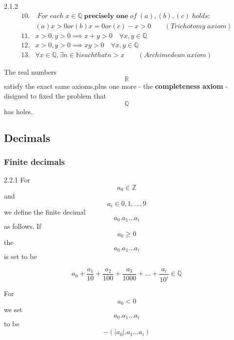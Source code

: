 \documentclass[a4paper]{article}
\begin{document}
\begin{axioms}{2.1.2}{}
    \begin{align*}
        10.&\;For \;each \; x\in \mathbb{Q}\; \textbf{precisely one} \;of \;(a),(b),(c) \;holds:\\  
        &(a)x>0 or (b)x=0 or (c)-x>0   \qquad(Trichotomy \;axiom)\\
        11.& x>0,y>0 \implies x+y>0  \quad\forall x,y \in \mathbb{Q}\\
        12.& x>0,y>0 \implies xy>0  \quad \forall x,y \in \mathbb{Q}\\ 
        13.& \forall x \in \mathbb{Q},\exists n \in \mathbb{N} such that n>x   \qquad(Archimedean \;axiom)
    \end{align*}
\end{axioms}
The real numbers $$\mathbb{R}$$ satisfy the exact same axioms,plus one more - the \textbf{completeness axiom} - disigned to fixed the problem that $$\mathbb{Q}$$ has holes.
\subsection{Decimals}
\subsubsection{Finite decimals}
\begin{definition}{2.2.1}{}
    For $$a_0 \in \mathbb{Z}$$ and $$a_i \in {0,1,...,9}$$ we define the finite decimal $$a_0.a_1...a_i$$ as follows. If $$a_0 \geq 0$$ the $$a_0.a_1...a_i$$ is set to be\\
    \begin{center}
        $$a_0+\frac{a_1}{10}+\frac{a_2}{100}+\frac{a_3}{1000}+...+\frac{a_i}{10^i} \in \mathbb{Q}$$
    \end{center}
    For $$a_0<0$$ we set $$a_0.a_1...a_i$$ to be $$- (\vert a_0 \vert.a_1...a_i) $$
\end{definition}
\end{document}
